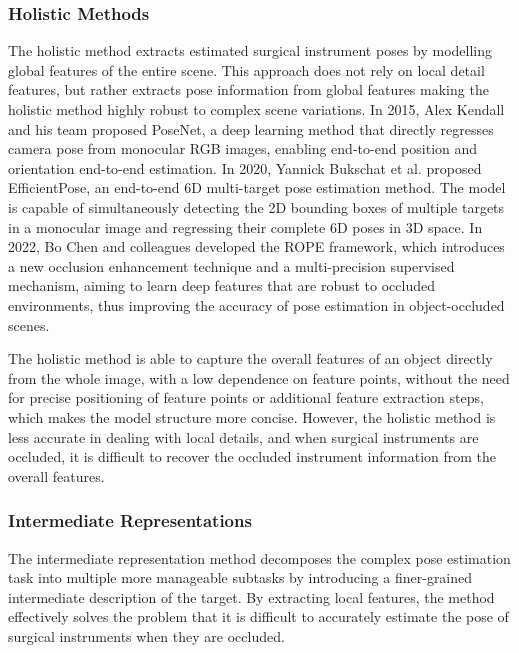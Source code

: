 \documentclass[12pt]{article}
\begin{document}
\subsubsection{Holistic Methods}
The holistic method extracts estimated surgical instrument poses by modelling global features of the entire scene\cite{fan2024reinforcement}. This approach does not rely on local detail features, but rather extracts pose information from global features making the holistic method highly robust to complex scene variations. In 2015, Alex Kendall and his team proposed PoseNet, a deep learning method that directly regresses camera pose from monocular RGB images, enabling end-to-end position and orientation end-to-end estimation\cite{kendall2015posenet}. In 2020, Yannick Bukschat et al. proposed EfficientPose, an end-to-end 6D multi-target pose estimation method. The model is capable of simultaneously detecting the 2D bounding boxes of multiple targets in a monocular image and regressing their complete 6D poses in 3D space\cite{bukschat2020efficientpose}. In 2022, Bo Chen and colleagues developed the ROPE framework, which introduces a new occlusion enhancement technique and a multi-precision supervised mechanism, aiming to learn deep features that are robust to occluded environments, thus improving the accuracy of pose estimation in object-occluded scenes\cite{chen2022occlusion}.

The holistic method is able to capture the overall features of an object directly from the whole image, with a low dependence on feature points, without the need for precise positioning of feature points or additional feature extraction steps, which makes the model structure more concise\cite{chen2022occlusion}. However, the holistic method is less accurate in dealing with local details, and when surgical instruments are occluded, it is difficult to recover the occluded instrument information from the overall features\cite{watson2014nature}.

\subsubsection{Intermediate Representations}
The intermediate representation method decomposes the complex pose estimation task into multiple more manageable subtasks by introducing a finer-grained intermediate description of the target. By extracting local features, the method effectively solves the problem that it is difficult to accurately estimate the pose of surgical instruments when they are occluded\cite{song2020hybridpose}.
\end{document}
